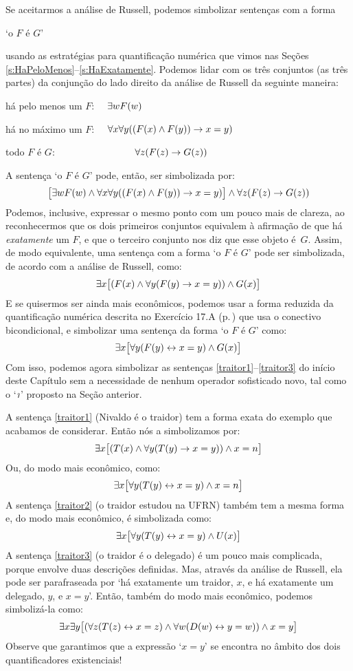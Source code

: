 Se aceitarmos a análise de Russell, podemos simbolizar sentenças com a forma
\begin{center}
	`o $F$ é $G$'
\end{center}
usando as estratégias para quantificação numérica que vimos nas Seções \ref{s:HaPeloMenos}--\ref{s:HaExatamente}.
Podemos lidar com os três conjuntos (as três partes) da conjunção do lado direito da análise de Russell da seguinte maneira:
\begin{ebullet}
	\item há pelo menos um $F$: \ \ $\exists w \mathord{F}(w)$
	\item há no máximo um $F$: \ \  $\forall x \forall y ((\mathord{F}(x) \wedge \mathord{F}(y)) \rightarrow x = y)$
	\item todo $F$ é $G$: \ \ \ \ \ \ \ \ \ \ \ \ \ \ \ \ $\forall z (\mathord{F}(z) \rightarrow \mathord{G}(z))$
\end{ebullet}
A sentença `o $F$ é $G$' pode, então, ser simbolizada por:
	$$\bigl[\exists w \mathord{F}(w) \wedge \forall x \forall y ((\mathord{F}(x) \wedge \mathord{F}(y)) \rightarrow x = y)\bigr] \wedge \forall z (\mathord{F}(z) \rightarrow \mathord{G}(z))$$
Podemos, inclusive, expressar o mesmo ponto com um pouco mais de clareza, ao reconhecermos que os dois primeiros conjuntos equivalem à afirmação de que há \emph{exatamente} um $F$, e que o terceiro conjunto nos diz que esse objeto é~$G$.
Assim, de modo equivalente, uma sentença com a forma `o $F$ é $G$' pode ser simbolizada, de acordo com a análise de Russell, como:
	$$\exists x \bigl[(\mathord{F}(x) \wedge \forall y (\mathord{F}(y) \rightarrow x = y)) \wedge \mathord{G}(x)\bigr]$$
E se quisermos ser ainda mais econômicos, podemos usar a forma reduzida da quantificação numérica descrita no Exercício 17.A (p.\,\pageref{e:HaExatamenteSee}) que usa o conectivo bicondicional,  e simbolizar uma sentença da forma `o $F$ é $G$' como: 
	$$\exists x \bigl[\forall y(\mathord{F}(y) \leftrightarrow x = y) \wedge \mathord{G}(x)\bigr]$$
Com isso, podemos agora simbolizar as sentenças \ref{traitor1}--\ref{traitor3} do início deste Capítulo sem a necessidade de nenhum operador sofisticado novo, tal como o `$\maththe$' proposto na Seção anterior.

A sentença \ref{traitor1} (Nivaldo é o traidor) tem a forma exata do exemplo que acabamos de considerar.
Então nós a simbolizamos por:
$$\exists x \bigl[(\mathord{T}(x) \wedge \forall y(\mathord{T}(y) \rightarrow x = y)) \wedge x = n\bigr]$$
Ou, do modo mais econômico, como:
$$\exists x \bigl[\forall y(\mathord{T}(y) \leftrightarrow x = y) \wedge x = n\bigr]$$
A sentença \ref{traitor2} (o traidor estudou na UFRN) também tem a mesma forma e, do modo mais econômico, é simbolizada como:  
$$\exists x \bigl[\forall y(\mathord{T}(y) \leftrightarrow x = y) \wedge \mathord{U}(x)\bigr]$$
A sentença \ref{traitor3} (o traidor é o delegado) é um pouco mais complicada, porque envolve duas descrições definidas.
Mas, através da análise de Russell, ela pode ser parafraseada por
`há exatamente um traidor, $x$, e há exatamente um delegado, $y$, e $x = y$'. Então, também do modo mais econômico, podemos simbolizá-la como: 
$$\exists x \exists y \bigl[(\forall z(\mathord{T}(z) \leftrightarrow x = z) \wedge \forall w(\mathord{D}(w) \leftrightarrow y = w)) \wedge x = y\bigr]$$
Observe que garantimos que a expressão `$x = y$' se encontra no âmbito dos dois quantificadores existenciais!


